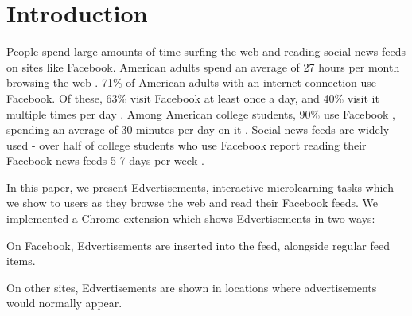 \documentclass{sigchi}
\begin{document}
\begin{abstract}
\end{abstract}




\section{Introduction}

People spend large amounts of time surfing the web and reading social news feeds on sites like Facebook.
American adults spend an average of 27 hours per month browsing the web \cite{nielsen2014}.
71\% of American adults with an internet connection use Facebook. Of these, 63\% visit Facebook at least once a day, and 40\% visit it multiple times per day \cite{socialmediaupdate}. Among American college students, 90\% use Facebook \cite{collegefacebook2}, spending an average of 30 minutes per day on it \cite{collegefacebook}. Social news feeds are widely used - over half of college students who use Facebook report reading their Facebook news feeds 5-7 days per week \cite{collegefacebook}. %

In this paper, we present Edvertisements, interactive microlearning tasks which we show to users as they browse the web and read their Facebook feeds. We implemented a Chrome extension which shows Edvertisements in two ways:

\begin{compactitem}
\item On Facebook, Edvertisements are inserted into the feed, alongside regular feed items.
\item On other sites, Edvertisements are shown in locations where advertisements would normally appear.
\end{compactitem}
\end{document}
